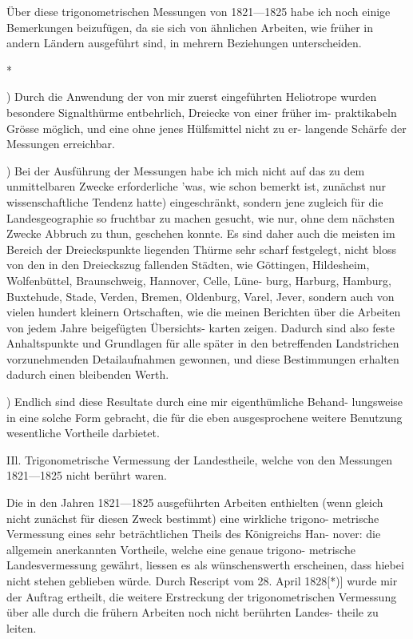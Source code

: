 \documentclass[12pt,a4paper]{article}
\theoremstyle{plain}
\theoremstyle{definition}
\theoremstyle{remark}
\begin{document}
\noindent
Über diese trigonometrischen Messungen von 1821---1825 habe ich noch
einige Bemerkungen beizufügen, da sie sich von ähnlichen Arbeiten, wie früher
in andern Ländern ausgeführt sind, in mehrern Beziehungen unterscheiden.


*

\noindent

) Durch die Anwendung der von mir zuerst eingeführten Heliotrope
wurden besondere Signalthürme entbehrlich, Dreiecke von einer früher im-
praktikabeln Grösse möglich, und eine ohne jenes Hülfsmittel nicht zu er-
langende Schärfe der Messungen erreichbar.

) Bei der Ausführung der Messungen habe ich mich nicht auf das zu
dem unmittelbaren Zwecke erforderliche 'was, wie schon bemerkt ist, zunächst
nur wissenschaftliche Tendenz hatte) eingeschränkt, sondern jene zugleich für
die Landesgeographie so fruchtbar zu machen gesucht, wie nur, ohne dem
nächsten Zwecke Abbruch zu thun, geschehen konnte. Es sind daher auch
die meisten im Bereich der Dreieckspunkte liegenden Thürme sehr scharf
festgelegt, nicht bloss von den in den Dreieckszug fallenden Städten, wie
Göttingen, Hildesheim, Wolfenbüttel, Braunschweig, Hannover, Celle, Lüne-
burg, Harburg, Hamburg, Buxtehude, Stade, Verden, Bremen, Oldenburg,
Varel, Jever, sondern auch von vielen hundert kleinern Ortschaften, wie die
meinen Berichten über die Arbeiten von jedem Jahre beigefügten Übersichts-
karten zeigen. Dadurch sind also feste Anhaltspunkte und Grundlagen für
alle später in den betreffenden Landstrichen vorzunehmenden Detailaufnahmen
gewonnen, und diese Bestimmungen erhalten dadurch einen bleibenden Werth.

) Endlich sind diese Resultate durch eine mir eigenthümliche Behand-
lungsweise in eine solche Form gebracht, die für die eben ausgesprochene
weitere Benutzung wesentliche Vortheile darbietet.

\noindent
IIl. Trigonometrische Vermessung der Landestheile,
welche von den Messungen 1821---1825 nicht berührt waren.

\noindent
Die in den Jahren 1821---1825 ausgeführten Arbeiten enthielten (wenn
gleich nicht zunächst für diesen Zweck bestimmt) eine wirkliche trigono-
metrische Vermessung eines sehr beträchtlichen Theils des Königreichs Han-
nover: die allgemein anerkannten Vortheile, welche eine genaue trigono-
metrische Landesvermessung gewährt, liessen es als wünschenswerth erscheinen,
dass hiebei nicht stehen geblieben würde. Durch Rescript vom 28. April 1828[*)]
wurde mir der Auftrag ertheilt, die weitere Erstreckung der trigonometrischen
Vermessung über alle durch die frühern Arbeiten noch nicht berührten Landes-
theile zu leiten.
\end{document}

